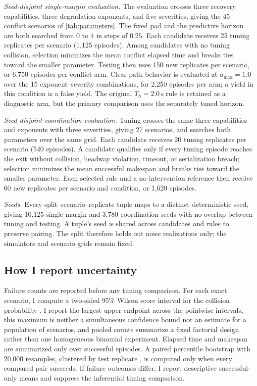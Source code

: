 \emph{Seed-disjoint single-margin evaluation.}  The evaluation crosses three
recovery capabilities, three degradation exponents, and five severities, giving
the 45 conflict scenarios of \cref{tab:parameters}.  The fixed pad and the
predictive horizon are both searched from $0$ to $4$ in steps of $0.25$.  Each
candidate receives 25 tuning replicates per scenario (1,125 episodes).  Among
candidates with no tuning collision, selection minimizes the mean conflict
elapsed time and breaks ties toward the smaller parameter.  Testing then uses
150 new replicates per scenario, or 6,750 episodes per conflict arm.  Clear-path
behavior is evaluated at $a_{\max}=1.0$ over the 15 exponent--severity
combinations, for 2,250 episodes per arm; a yield in this condition is a false
yield.  The original $T_h=2.0$\,s rule is retained as a diagnostic arm, but the
primary comparison uses the separately tuned horizon.

\emph{Seed-disjoint coordination evaluation.}  Tuning crosses the same three
capabilities and exponents with three severities, giving 27 scenarios, and
searches both parameters over the same grid.  Each candidate receives 20 tuning
replicates per scenario (540 episodes).  A candidate qualifies only if every
tuning episode reaches the exit without collision, headway violation, timeout,
or serialization breach; selection minimizes the mean successful makespan and
breaks ties toward the smaller parameter.  Each selected rule and a
no-intervention reference then receive 60 new replicates per scenario and
condition, or 1,620 episodes.

\emph{Seeds.}  Every split--scenario--replicate tuple maps to a distinct
deterministic seed, giving 10,125 single-margin and 3,780 coordination seeds
with no overlap between tuning and testing.  A tuple's seed is shared across
candidates and rules to preserve pairing.  The split therefore holds out noise
realizations only; the simulators and scenario grids remain fixed.

\subsection{How I report uncertainty}

Failure counts are reported before any timing comparison.  For each exact
scenario, I compute a two-sided 95\% Wilson score interval for the collision
probability \cite{wilson1927}.  I report the largest upper endpoint across the
pointwise intervals; this maximum is neither a simultaneous confidence bound nor
an estimate for a population of scenarios, and pooled counts summarize a fixed
factorial design rather than one homogeneous binomial experiment.  Elapsed time
and makespan are summarized only over successful episodes.  A paired percentile
bootstrap with 20,000 resamples, clustered by test replicate
\cite{efron1993bootstrap}, is computed only when every compared pair succeeds.
If failure outcomes differ, I report descriptive successful-only means and
suppress the inferential timing comparison.

